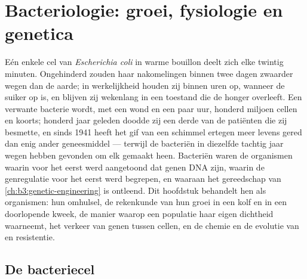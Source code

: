\chapter{Bacteriologie: groei, fysiologie en genetica}\label{ch:b3:bacteriology}

Eén enkele cel van \emph{Escherichia coli} in warme bouillon deelt zich
elke twintig minuten. Ongehinderd zouden haar nakomelingen binnen twee
dagen zwaarder wegen dan de aarde; in werkelijkheid houden zij binnen
uren op, wanneer de suiker op is, en blijven zij wekenlang in een
toestand die de honger overleeft. Een verwante bacterie wordt, met een
wond en een paar uur, honderd miljoen cellen en koorts; honderd jaar
geleden doodde zij een derde van de patiënten die zij besmette, en
sinds 1941 heeft het gif van een schimmel ertegen meer levens gered dan
enig ander geneesmiddel --- terwijl de bacteriën in diezelfde tachtig
jaar wegen hebben gevonden om elk gemaakt  heen. Bacteriën
waren de organismen waarin voor het eerst werd aangetoond dat genen DNA
zijn, waarin de genregulatie voor het eerst werd begrepen, en waaraan
het gereedschap van \cref{ch:b3:genetic-engineering} is ontleend. Dit
hoofdstuk behandelt hen als organismen: hun omhulsel, de rekenkunde van
hun groei in een kolf en in een doorlopende kweek, de manier waarop een
populatie haar eigen dichtheid waarneemt, het verkeer van genen tussen
cellen, en de chemie en de evolutie van  en resistentie.

\section{De bacteriecel}

